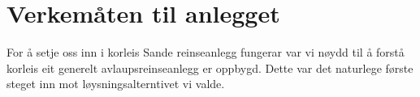 \chapter{Verkemåten til anlegget}\label{sec:6}
\thispagestyle{fancy}

For å setje oss inn i korleis Sande reinseanlegg fungerar var vi nøydd til å forstå
korleis eit generelt avlaupsreinseanlegg er oppbygd. Dette var det naturlege første
steget inn mot løysningsalterntivet vi valde. 


